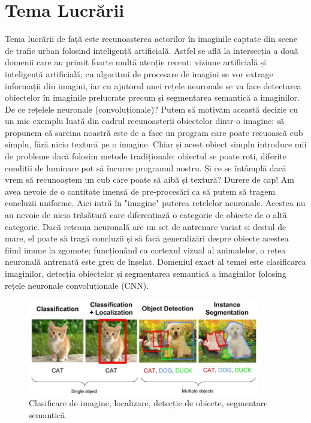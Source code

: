 \section {Tema Lucrării}
Tema lucrării de față este recunoașterea actorilor în imaginile captate din scene de trafic urban folosind inteligență artificială. Astfel se află la intersecția a două domenii care au primit foarte multă atenție recent: viziune artificială și inteligență artificială; cu algoritmi de procesare de imagini se vor extrage informații din imagini, iar cu ajutorul unei rețele neuronale se va face detectarea obiectelor în imaginile prelucrate precum și segmentarea semantică a imaginilor.\newline
De ce rețelele neuronale (convoluționale)? Putem să motivăm această decizie cu un mic exemplu luată din cadrul recunoașterii obiectelor dintr-o imagine: să propunem că sarcina noastră este de a face un program care poate recuoască cub simplu, fără nicio textură pe o imagine. Chiar și acest obiect simplu introduce mii de probleme dacă folosim metode tradiționale: obiectul se poate roti, diferite condiții de luminare pot să încurce programul nostru. Și ce se întâmplă dacă vrem să recunoaștem un cub care poate să aibă și textură? Durere de cap! Am avea nevoie de o cantitate imensă de pre-procesări ca să putem să tragem concluzii uniforme.\newline
Aici intră în "imagine" puterea rețelelor neuronale. Acestea nu au nevoie de nicio trăsătură care diferențiază o categorie de obiecte de o altă categorie. Dacă rețeaua neuronală are un set de antrenare variat și destul de mare, el poate să tragă concluzii și să facă generalizări despre obiecte acestea fiind imune la zgomote; funcționând ca cortexul vizual al animalelor, o rețea neuronală antrenată este greu de înșelat.\newline
Domeniul exact al temei este clasificarea imaginilor, detecția obiectelor și segmentarea semantică a imaginilor folosing rețele neuronale convoluționale (CNN).
\begin{figure}[h!]
    	\centering
	\captionsetup{justification=centering, margin=2cm}
	\includegraphics[width=0.9\textwidth]{figures/class_detect_segment.jpeg}
	\caption{Clasificare de imagine, localizare, detecție de obiecte, segmentare semantică \cite{class_detect_segment}}
	\label{fig:class_detect_semgent}
\end{figure}
